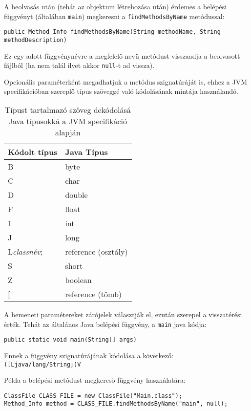 A beolvasás után (tehát az objektum létrehozása után) érdemes a belépési függvényt (általában \lstinline{main}) megkeresni a \lstinline{findMethodsByName} metódussal:
\begin{verbatim}
public Method_Info findMethodsByName(String methodName, String methodDescription)
\end{verbatim}
Ez egy adott függvénynévre a megfelelő nevü metódust visszaadja a beolvasott fájlból (ha nem talál ilyet akkor \lstinline{null}-t ad vissza). 

Opcionális paraméterként megadhatjuk a metódus szignatúráját is, ehhez a JVM specifikációban szereplő típus szöveggé való kódolásának mintája használandó.
\begin{table}[H]
	\centering
	\begin{tabular}{ | m{} | m{} | }
		\hline
		\textbf{Kódolt típus} & \textbf{Java Típus} \\
		\hline \hline
		B & byte \\
		\hline
		C & char \\
		\hline
		D & double \\
		\hline
		F & float \\
		\hline
		I & int \\
		\hline
		J & long \\
		\hline
		L\textit{classnév}; & reference (osztály) \\
		\hline
		S & short \\
		\hline
		Z & boolean \\
		\hline
		{[} & reference (tömb) \\
		\hline
	\end{tabular}
	\caption{Típust tartalmazó szöveg dekódolásá Java típusokká a JVM specifikáció alapján}
	\label{tab:jvmtypeencoding}
\end{table}

A bemeneti paramétereket zárójelek választják el, ezután szerepel a visszatérési érték. Tehát az általános Java belépési függvény, a \lstinline{main} java kódja:
\begin{verbatim}
public static void main(String[] args)
\end{verbatim}
Ennek a függvény szignatúrájának kódolása a következő: \lstinline{([Ljava/lang/String;)V}

Példa a belépési metódust megkereső függvény használatára:
\begin{verbatim}
ClassFile CLASS_FILE = new ClassFile("Main.class");
Method_Info method = CLASS_FILE.findMethodsByName("main", null);
\end{verbatim}

